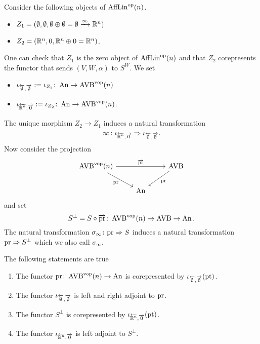 Consider the following objects of $\operatorname{AffLin}^{\mathrm{op}}(n)$.
\begin{itemize}
    \item $Z_1 = (\emptyset, \emptyset, \emptyset \oplus \emptyset = \emptyset \xrightarrow{\infty} \mathbb{R}^n)$
    \item $Z_2 = (\mathbb{R}^n, 0, \mathbb{R}^n \oplus 0 = \mathbb{R}^n)$.
\end{itemize}
One can check that $Z_1$ is the zero object of $\operatorname{AffLin}^{\mathrm{op}}(n)$ and that $Z_2$ corepresents the functor 
that sends $(V,W,\alpha)$ to $S^W$.
We set 
\begin{itemize}
    \item $\iota_{\overleftarrow{\emptyset},\overrightarrow{\emptyset}} := \iota_{Z_1} \colon \operatorname{An} \to \operatorname{AVB}^{\mathrm{vop}}(n)$
    \item $\iota_{\overleftarrow{\mathbb{R}^n},\overrightarrow{0}} := \iota_{Z_2} \colon \operatorname{An} \to \operatorname{AVB}^{\mathrm{vop}}(n)$.
\end{itemize}
The unique morphism $Z_2 \to Z_1$ induces a natural transformation \[
    \infty \colon \iota_{\overleftarrow{\mathbb{R}^n},\overrightarrow{0}} \Rightarrow 
\iota_{\overleftarrow{\emptyset},\overrightarrow{\emptyset}}.
\]
Now consider the projection 
\[\begin{tikzcd}
	{\AVB^\vop(n)} && \AVB \\
	& \An
	\arrow["{\overrightarrow{\pr}}", from=1-1, to=1-3]
	\arrow["\pr"', from=1-1, to=2-2]
	\arrow["\pr", from=1-3, to=2-2]
\end{tikzcd}\]
and set 
\[
S^\perp = S \circ \overrightarrow{\mathrm{pr}} \colon \operatorname{AVB}^{\mathrm{vop}}(n) \to \operatorname{AVB} \to \operatorname{An}.  
\]
The natural transformation $\sigma_\infty \colon \mathrm{pr} \Rightarrow S$ induces a 
natural transformation $\mathrm{pr} \Rightarrow S^\perp$ which we also call $\sigma_\infty$.

\begin{lemma}The following statements are true
    \begin{enumerate}
        \item The functor $\mathrm{pr} \colon \operatorname{AVB}^{\mathrm{vop}}(n) \to \operatorname{An}$ is corepresented by $\iota_{\overleftarrow{\emptyset},\overrightarrow{\emptyset}}(\mathrm{pt})$.
        \item The functor $\iota_{\overleftarrow{\emptyset},\overrightarrow{\emptyset}}$ is left and right adjoint to $\mathrm{pr}$.
        \item The functor $S^\perp$ is corepresented by $\iota_{\overleftarrow{\mathbb{R}^n},\overrightarrow{0}}(\mathrm{pt})$.
        \item The functor $\iota_{\overleftarrow{\mathbb{R}^n},\overrightarrow{0}}$ is left adjoint to $S^\perp$.
    \end{enumerate}\label{lemma:favouritelemma}
\end{lemma}

